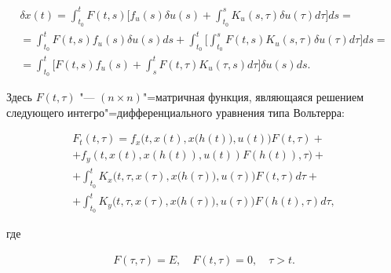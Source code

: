 \begin{multline}

\label{mans:eq22}

\delta x(t)= \int_{t_{0}}^{t} F(t,s) 

\biggl[ f_{u}(s) \delta u(s) + \int_{t_{0}}^{s} K_{u}(s, \tau) \delta u(\tau) d\tau \biggr] ds= \\

= 

\int_{t_{0}}^{t} F(t,s)f_{u}(s) \delta u(s)ds+  \int_{t_{0}}^{t} 

\biggl[  \int_{t_{0}}^{s} F(t,s) K_{u}(s, \tau) \delta u(\tau) d\tau \biggr] ds =

\\

=

\int_{t_{0}}^{t}  \biggl[ F(t,s) f_{u}(s) + \int_{s}^{t} F(t,\tau) K_{u}(\tau, s) d\tau \biggr]  \delta u(s) ds.

\end{multline}

Здесь  $ F(t, \tau) $ "--- $ (n {\times} n) $"=матричная функция, являющаяся решением следующего интегро"=дифференциального уравнения типа Вольтерра:

\begin{multline*}

F_{t}(t, \tau)=f_{x} \bigl(t, x(t), x\bigl(h(t)\bigr), u(t)\bigr) F(t, \tau) + 

\\

+f_{y}(t, x(t), x(h(t)), u(t)) F(h(t)), \tau)+ \\

+\int_{t_{0}}^{t} K_{x}\bigl(t, \tau, x(\tau), x\bigl(h(\tau)\bigr), u(\tau)\bigr) F(t, \tau) d\tau +

\\

+ \int_{t_{0}}^{t} K_{y} \bigl(t, \tau, x(\tau), x\bigl(h(\tau)\bigr), u(\tau)\bigr) F(h(t), \tau) d\tau ,

\end{multline*}

где

\begin{gather}

\label{mans:eq23}

F(\tau, \tau)=E , \quad F(t, \tau)=0 , \quad \tau >t .

\end{gather}








